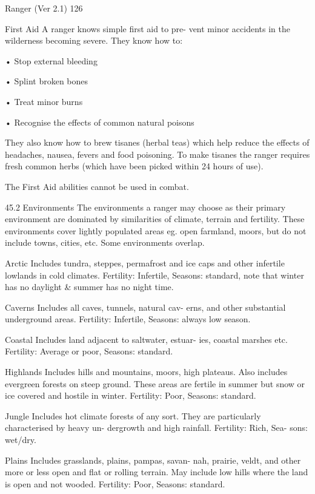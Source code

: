 \begin{Chapter}{Ranger (Ver 2.1)}
126 

First  Aid  A  ranger  knows  simple  first  aid  to  pre-
vent  minor  accidents  in  the  wilderness  becoming 
severe. They know how to:  

• Stop external bleeding  

• Splint broken bones  

• Treat minor burns  

• Recognise the effects of common natural poisons 

They  also  know  how  to  brew  tisanes  (herbal  teas) 
which help reduce the effects of headaches, nausea, 
fevers  and  food  poisoning.  To  make  tisanes  the 
ranger  requires  fresh  common  herbs  (which  have 
been picked within 24 hours of use). 

The First Aid abilities cannot be used in combat. 

45.2 Environments 
The  environments  a  ranger  may  choose  as  their 
primary environment are dominated by similarities 
of climate, terrain and fertility. These environments 
cover  lightly  populated  areas  eg.  open  farmland, 
moors,  but do  not  include  towns,  cities,  etc.  Some 
environments overlap. 

Arctic Includes tundra, steppes, permafrost and ice 
caps  and  other  infertile  lowlands  in  cold  climates. 
Fertility:  Infertile,  Seasons:  standard,  note  that 
winter  has  no  daylight  \&  summer  has  no  night 
time. 

Caverns  Includes  all  caves,  tunnels,  natural  cav-
erns,  and  other  substantial  underground  areas. 
Fertility: Infertile, Seasons: always low season. 

Coastal Includes land adjacent to saltwater, estuar-
ies, coastal marshes etc. Fertility: Average or poor, 
Seasons: standard. 

Highlands  Includes  hills  and  mountains,  moors, 
high  plateaus.  Also  includes  evergreen  forests  on 
steep ground. These areas are fertile in summer but 
snow or ice covered and hostile in winter. Fertility: 
Poor, Seasons: standard. 

Jungle  Includes  hot  climate  forests  of  any  sort. 
They  are  particularly  characterised  by  heavy  un-
dergrowth  and  high  rainfall.  Fertility:  Rich,  Sea-
sons: wet/dry. 

Plains  Includes  grasslands,  plains, pampas,  savan-
nah, prairie, veldt, and other more or less open and 
flat or rolling terrain. May include low hills where 
the  land  is  open  and  not  wooded.  Fertility:  Poor, 
Seasons: standard. 


\end{Chapter}
